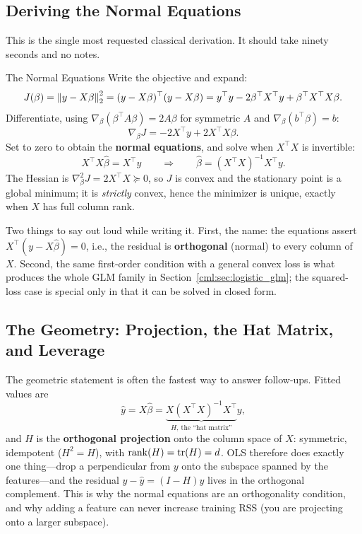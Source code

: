 \subsection{Deriving the Normal Equations}

This is the single most requested classical derivation. It should take ninety seconds and no notes.

\begin{mathresult}{The Normal Equations}
Write the objective and expand:
\begin{equation}
J(\beta) = \left\lVert y - X\beta\right\rVert_2^2 = (y - X\beta)^{\top}(y - X\beta) = y^{\top}y - 2\beta^{\top}X^{\top}y + \beta^{\top}X^{\top}X\beta .
\end{equation}
Differentiate, using $\nabla_\beta (\beta^{\top}A\beta) = 2A\beta$ for symmetric $A$ and $\nabla_\beta (b^{\top}\beta) = b$:
\begin{equation}
\nabla_\beta J = -2X^{\top}y + 2X^{\top}X\beta .
\end{equation}
Set to zero to obtain the \textbf{normal equations}, and solve when $X^{\top}X$ is invertible:
\begin{equation}
X^{\top}X\hat\beta = X^{\top}y \qquad\Longrightarrow\qquad \hat\beta = (X^{\top}X)^{-1}X^{\top}y .
\end{equation}
The Hessian is $\nabla^2_\beta J = 2X^{\top}X \succeq 0$, so $J$ is convex and the stationary point is a global minimum; it is \emph{strictly} convex, hence the minimizer is unique, exactly when $X$ has full column rank.
\end{mathresult}

Two things to say out loud while writing it. First, the name: the equations assert $X^{\top}(y - X\hat\beta) = 0$, i.e., the residual is \textbf{orthogonal} (normal) to every column of $X$. Second, the same first-order condition with a general convex loss is what produces the whole GLM family in Section~\ref{cml:sec:logistic_glm}; the squared-loss case is special only in that it can be solved in closed form.

\subsection{The Geometry: Projection, the Hat Matrix, and Leverage}

The geometric statement is often the fastest way to answer follow-ups. Fitted values are
\begin{equation}
\hat y = X\hat\beta = \underbrace{X(X^{\top}X)^{-1}X^{\top}}_{H,\ \text{the ``hat matrix''}} y ,
\end{equation}
and $H$ is the \textbf{orthogonal projection} onto the column space of $X$: symmetric, idempotent ($H^2 = H$), with $\operatorname{rank}(H) = \operatorname{tr}(H) = d$. OLS therefore does exactly one thing---drop a perpendicular from $y$ onto the subspace spanned by the features---and the residual $y - \hat y = (I-H)y$ lives in the orthogonal complement. This is why the normal equations are an orthogonality condition, and why adding a feature can never increase training RSS (you are projecting onto a larger subspace).


